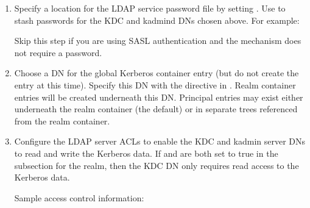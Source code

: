 \documentclass[letterpaper,10pt,english]{sphinxmanual}
\begin{document}
\begin{enumerate}
\item {} 
Specify a location for the LDAP service password file by setting
.  Use 
to stash passwords for the KDC and kadmind DNs chosen above.  For
example:

%
\begin{sphinxVerbatim}[commandchars=\\\{\}]
    
\end{sphinxVerbatim}

Skip this step if you are using SASL authentication and the
mechanism does not require a password.

\item {} 
Choose a DN for the global Kerberos container entry (but do not
create the entry at this time).  Specify this DN with the
 directive in {\hyperref[\detokenize{admin/conf_files/kdc_conf:kdc-conf-5}]{}}.
Realm container entries will be created underneath this DN.
Principal entries may exist either underneath the realm container
(the default) or in separate trees referenced from the realm
container.

\item {} 
Configure the LDAP server ACLs to enable the KDC and kadmin server
DNs to read and write the Kerberos data.  If
 and  are both set to
true in the {\hyperref[\detokenize{admin/conf_files/kdc_conf:dbmodules}]{}} subsection for the realm, then the
KDC DN only requires read access to the Kerberos data.

Sample access control information:

%
\begin{sphinxVerbatim}[commandchars=\\\{\}]
  
      

  
      


\end{sphinxVerbatim}
\end{enumerate}
\end{document}
